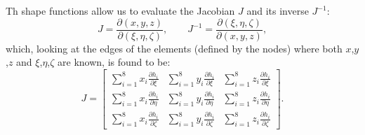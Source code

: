 Th shape functions allow us to evaluate the Jacobian $J$ and
its inverse $J^{-1}$:
\begin{equation}
  J = \frac{\partial(x,y,z)}{\partial(\xi,\eta,\zeta)},\qquad
    J^{-1} = \frac{\partial(\xi,\eta,\zeta)}{\partial(x,y,z)},
    \label{jacobi}
\end{equation}
which, looking at the edges of the elements (defined by the nodes)
where both $x$,$y$,$z$ and $\xi$,$\eta$,$\zeta$ are known, is found to be:
\begin{equation}
  J = \left[
    \begin{array}{ccc}
      \sum_{i=1}^8x_i\frac{\partial h_i}{\partial\xi} &
      \sum_{i=1}^8y_i\frac{\partial h_i}{\partial\xi} &
      \sum_{i=1}^8z_i\frac{\partial h_i}{\partial\xi} \\
      \sum_{i=1}^8x_i\frac{\partial h_i}{\partial\eta} &
      \sum_{i=1}^8y_i\frac{\partial h_i}{\partial\eta} &
      \sum_{i=1}^8z_i\frac{\partial h_i}{\partial\eta} \\
      \sum_{i=1}^8x_i\frac{\partial h_i}{\partial\zeta} &
      \sum_{i=1}^8y_i\frac{\partial h_i}{\partial\zeta} &
      \sum_{i=1}^8z_i\frac{\partial h_i}{\partial\zeta}
    \end{array}
    \right].
  \label{eqn-jacobien}
\end{equation}

